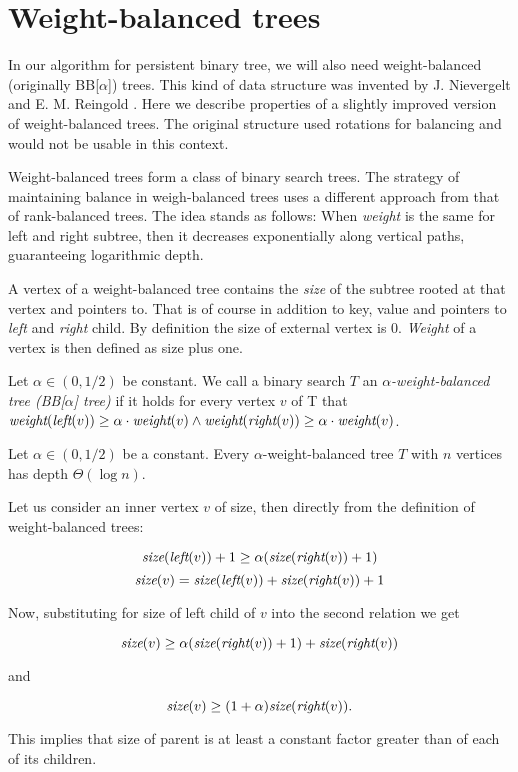 \section{Weight-balanced trees}

In our algorithm for persistent binary tree, we will also need weight-balanced (originally BB[$\alpha$]) trees. This kind of data structure was invented by J. Nievergelt and E. M. Reingold \cite{weight-balanced}. Here we describe properties of a slightly improved version of weight-balanced trees. The original structure used rotations for balancing and would not be usable in this context.

Weight-balanced trees form a class of binary search trees. The strategy of maintaining balance in weigh-balanced trees uses a different approach from that of rank-balanced trees. The idea stands as follows: When \emph{weight} is the same for left and right subtree, then it decreases exponentially along vertical paths, guaranteeing logarithmic depth.

A vertex of a weight-balanced tree contains the {\em size} of the subtree rooted at that vertex and pointers to. That is of course in addition to key, value and pointers to {\em left} and {\em right} child. By definition the size of external vertex is 0. {\em Weight} of a vertex is then defined as size plus one.

\begin{defn}
Let $\alpha \in (0,1/2)$ be constant. We call a binary search $T$ an {\em $\alpha$-weight-balanced tree (BB[$\alpha$] tree)} if it holds for every vertex $v$ of T that $\text{\it weight}(\text{\it left}(v)) \geq \alpha \cdot \text{\it weight}(v) \wedge \text{\it weight}(\text{\it right}(v)) \geq \alpha \cdot \text{\it weight}(v) $.
\end{defn}

\begin{prop}
Let $\alpha \in (0,1/2)$ be a constant. Every $\alpha$-weight-balanced tree $T$ with $n$ vertices has depth $\Theta(\log n)$. 
\end{prop}

\begin{myproof}
Let us consider an inner vertex $v$ of size, then directly from the definition of weight-balanced trees:

$$ \text{\it size}(\text{\it left}(v)) + 1 \geq \alpha (\text{\it size}(\text{\it right}(v))+1)$$
$$ \text{\it size}(v) = \text{\it size}(\text{\it left}(v)) + \text{\it size}(\text{\it right}(v)) + 1 $$

Now, substituting for size of left child of $v$ into the second relation we get

$$ \text{\it size}(v) \geq \alpha (\text{\it size}(\text{\it right}(v)) + 1) + \text{\it size}(\text{\it right}(v)) $$

and

$$ \text{\it size}(v) \geq (1+\alpha)\text{\it size}(\text{\it right}(v)).$$

This implies that size of parent is at least a constant factor greater than of each of its children.
\end{myproof}

